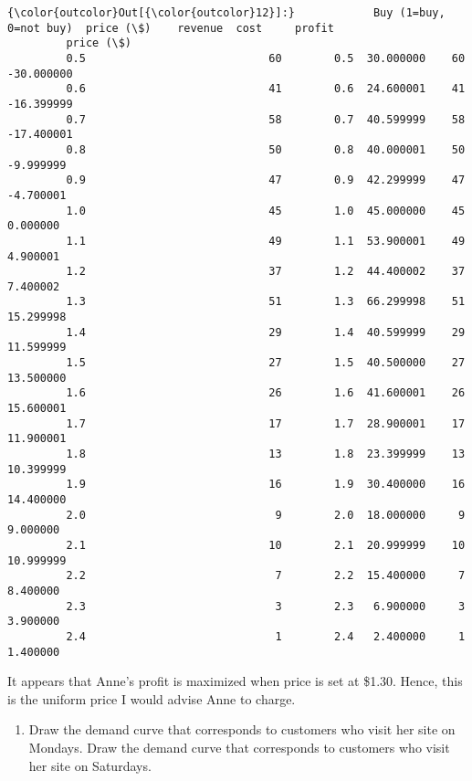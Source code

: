 \documentclass[11pt]{article}
\providecommand{\tightlist}{%
      \setlength{\itemsep}{0pt}\setlength{\parskip}{0pt}}
\begin{document}
\begin{Verbatim}[commandchars=\\\{\}]
{\color{outcolor}Out[{\color{outcolor}12}]:}            Buy (1=buy, 0=not buy)  price (\$)    revenue  cost     profit
         price (\$)                                                               
         0.5                            60        0.5  30.000000    60 -30.000000
         0.6                            41        0.6  24.600001    41 -16.399999
         0.7                            58        0.7  40.599999    58 -17.400001
         0.8                            50        0.8  40.000001    50  -9.999999
         0.9                            47        0.9  42.299999    47  -4.700001
         1.0                            45        1.0  45.000000    45   0.000000
         1.1                            49        1.1  53.900001    49   4.900001
         1.2                            37        1.2  44.400002    37   7.400002
         1.3                            51        1.3  66.299998    51  15.299998
         1.4                            29        1.4  40.599999    29  11.599999
         1.5                            27        1.5  40.500000    27  13.500000
         1.6                            26        1.6  41.600001    26  15.600001
         1.7                            17        1.7  28.900001    17  11.900001
         1.8                            13        1.8  23.399999    13  10.399999
         1.9                            16        1.9  30.400000    16  14.400000
         2.0                             9        2.0  18.000000     9   9.000000
         2.1                            10        2.1  20.999999    10  10.999999
         2.2                             7        2.2  15.400000     7   8.400000
         2.3                             3        2.3   6.900000     3   3.900000
         2.4                             1        2.4   2.400000     1   1.400000
\end{Verbatim}
            
    It appears that Anne's profit is maximized when price is set at \$1.30.
Hence, this is the uniform price I would advise Anne to charge.

    \begin{enumerate}
\def\labelenumi{\arabic{enumi})}
\setcounter{enumi}{2}
\tightlist
\item
  Draw the demand curve that corresponds to customers who visit her site
  on Mondays. Draw the demand curve that corresponds to customers who
  visit her site on Saturdays.
\end{enumerate}
\end{document}
